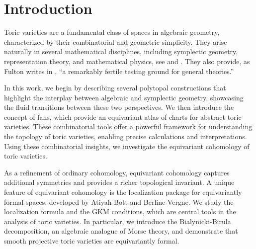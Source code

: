 \documentclass{amsart}
\numberwithin{equation}{section}
\theoremstyle{plain} %
\theoremstyle{definition}
\theoremstyle{remark}
\begin{document}




\section{Introduction}
Toric varieties are a fundamental class of spaces in algebraic geometry, characterized by their combinatorial and geometric simplicity. They arise naturally in several mathematical disciplines, including symplectic geometry, representation theory, and mathematical physics, see \cite{cannas} and \cite{oda}. They also provide, as Fulton writes in \cite{fulton}, “a remarkably fertile testing ground for general theories.”

In this work, we begin by describing several polytopal constructions that highlight the interplay between algebraic and symplectic geometry, showcasing the fluid transitions between these two perspectives. We then introduce the concept of fans, which provide an equivariant atlas of charts for abstract toric varieties. These combinatorial tools offer a powerful framework for understanding the topology of toric varieties, enabling precise calculations and interpretations. Using these combinatorial insights, we investigate the equivariant cohomology of toric varieties. 

As a refinement of ordinary cohomology, equivariant cohomology captures additional symmetries and provides a richer topological invariant. A unique feature of equivariant cohomology is the localization package for equivariantly formal spaces, developed by Atiyah-Bott and Berline-Vergne. We study the localization formula and the GKM conditions, which are central tools in the analysis of toric varieties. In particular, we introduce the Bialynicki-Birula decomposition, an algebraic analogue of Morse theory, and demonstrate that smooth projective toric varieties are equivariantly formal.
\end{document}
